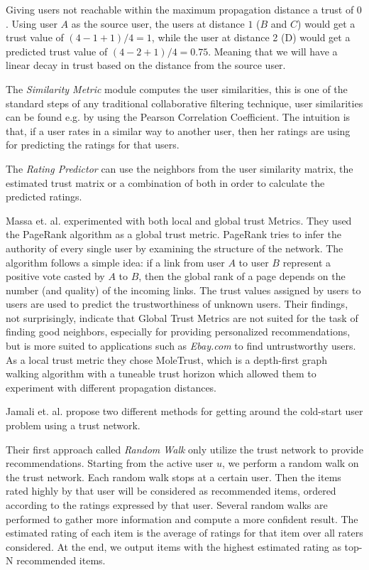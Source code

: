 Giving users not reachable within the maximum propagation distance a trust of
$0$. Using user $A$ as the source user, the users at distance $1$ ($B$ and $C$)
would get a trust value of $(4-1+1)/4 = 1$, while the user at distance 2 (D)
would get a predicted trust value of $(4-2+1)/4 = 0.75$. Meaning that we will
have a linear decay in trust based on the distance from the source user.

The \emph{Similarity Metric} module computes the user similarities, this is one
of the standard steps of any traditional collaborative filtering technique,
user similarities can be found e.g. by using the Pearson Correlation
Coefficient. The intuition is that, if a user rates in a similar way to another
user, then her ratings are using for predicting the ratings for that users.

The \emph{Rating Predictor} can use the neighbors from the user similarity
matrix, the estimated trust matrix or a combination of both in order to
calculate the predicted ratings.


Massa et. al. \cite{Massa2007} experimented with both local and global trust
Metrics. They used the PageRank algorithm as a global trust metric. PageRank
tries to infer the authority of every single user by examining the structure of
the network. The algorithm follows a simple idea: if a link from user $A$ to user
$B$ represent a positive vote casted by $A$ to $B$, then the global rank of a page
depends on the number (and quality) of the incoming links. The trust values
assigned by users to users are used to predict the trustworthiness of unknown
users. Their findings, not surprisingly, indicate that Global Trust Metrics are
not suited for the task of finding good neighbors, especially for providing
personalized recommendations, but is more suited to applications such as \emph{Ebay.com} to find untrustworthy users. As a local trust metric they chose MoleTrust, which is a depth-first graph walking algorithm with a tuneable trust horizon
which allowed them to experiment with different propagation distances.



Jamali et. al. \cite{Jamali2009} propose two different methods for getting
around the cold-start user problem using a trust network.

Their first approach called \emph{Random Walk} only utilize the trust network to provide recommendations. Starting from the active user $u$, we perform a random walk on the trust network. Each
random walk stops at a certain user. Then the items rated highly by that user
will be considered as recommended items, ordered according to the ratings
expressed by that user. Several random walks are performed to gather more
information and compute a more confident result. The estimated rating of each
item is the average of ratings for that item over all raters considered. At the
end, we output items with the highest estimated rating as top-N recommended
items.

